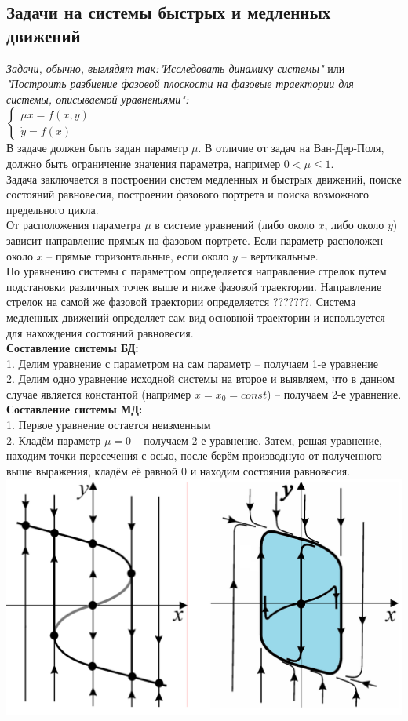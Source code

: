 \begin{multicols*}{2}
		\section{Задачи на системы быстрых и медленных движений}
		\textit{Задачи, обычно, выглядят так:"Исследовать динамику системы"} или \textit{"Построить разбиение фазовой плоскости на фазовые траектории для системы, описываемой уравнениями":\\
		$\begin{cases}
			\mu\dot{x} = f(x, y)\\
			\dot{y} = f(x)
		\end{cases}$}\\
		В задаче должен быть задан параметр $\mu$. В отличие от задач на Ван-Дер-Поля, должно быть ограничение значения параметра, например $0 < \mu \leqslant 1$.\\
		Задача заключается в построении систем медленных и быстрых движений, поиске состояний равновесия, построении фазового портрета и поиска возможного предельного цикла.  \\
		От расположения параметра $\mu$ в системе уравнений (либо около $x$, либо около $y$) зависит направление прямых на фазовом портрете. Если параметр расположен около $x$ – прямые горизонтальные, если около $y$ – вертикальные.\\ 
		По уравнению системы с параметром определяется направление стрелок путем подстановки различных точек выше и ниже фазовой траектории. Направление стрелок на самой же фазовой траектории определяется ???????. Система медленных движений определяет сам вид основной траектории и используется для нахождения состояний равновесия.\\ 
		\textbf{Составление системы БД:}\\
		1. Делим уравнение с параметром на сам параметр – получаем 1-е уравнение\\
		2. Делим одно уравнение исходной системы на второе и выявляем, что в данном случае является константой (например $x = x_0 = const$) – получаем 2-е уравнение.\\
		\textbf{Составление системы МД:}\\
		1. Первое уравнение остается неизменным\\
		2. Кладём параметр $\mu = 0$ – получаем 2-е уравнение. Затем, решая уравнение, находим точки пересечения с осью, после берём производную от полученного выше выражения, кладём её равной 0 и находим состояния равновесия.\\
		\includegraphics[width=0.45\linewidth]{tk_practice_img/sbmd}


	\end{multicols*}
